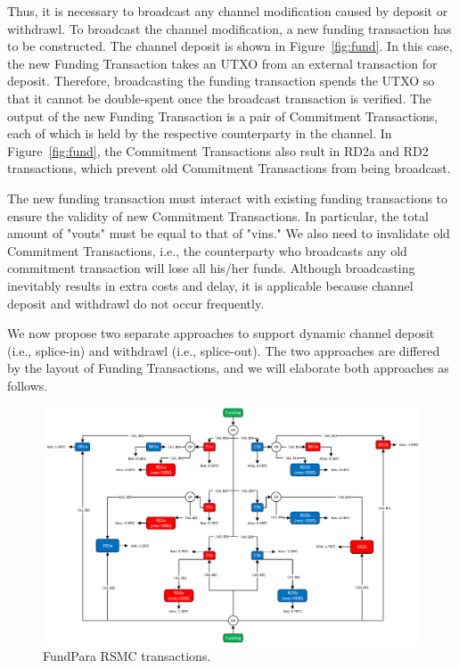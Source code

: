 Thus, it is necessary to broadcast any channel modification caused by deposit or
withdrawl. To broadcast the channel modification, a new funding transaction has to
be constructed. The channel deposit is shown in Figure~\ref{fig:fund}. In this case, the new Funding Transaction takes an UTXO from an external transaction for deposit. Therefore, broadcasting the funding transaction spends the UTXO so that it cannot be double-spent once the broadcast transaction is verified. The output of the new Funding Transaction is a pair of Commitment Transactions, each of which is held by the respective counterparty in the channel. In Figure~\ref{fig:fund}, the Commitment Transactions also rsult in RD2a and RD2 transactions, which prevent old Commitment Transactions from being broadcast.


The new funding transaction must interact with existing funding transactions to
ensure the validity of new Commitment Transactions. In particular, the total
amount of "vouts" must be equal to that of "vins." We also need to invalidate old Commitment Transactions, i.e., the counterparty who broadcasts any old commitment transaction will lose all his/her funds. Although broadcasting inevitably results in extra costs and delay, it is applicable because channel deposit and withdrawl do not occur frequently.


We now propose two separate approaches to support dynamic channel
deposit (i.e., splice-in) and withdrawl (i.e., splice-out). The two approaches are
differed by the layout of Funding Transactions, and we will elaborate both approaches as follows.

\begin{figure}[H]
\centering
\includegraphics[width=6in]{figs/rsmc_new.pdf}
\vspace{-6pt}
\caption{FundPara RSMC transactions.}
\label{fig:rsmc_new}
\end{figure}

